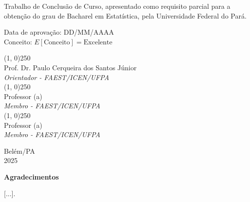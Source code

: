 \vspace{2.0 cm}

{\normalsize
\hfill \parbox{8.0 cm}{Trabalho de Conclusão de Curso, apresentado como
requisito parcial para a obtenção do grau de Bacharel em Estatística, pela Universidade Federal do Pará.}
}

\vspace{1.5 cm}

\noindent Data de aprovação: DD/MM/AAAA \\
Conceito: $E [\text{Conceito}] = \text{Excelente}$ \\

\vspace{2.25 cm}

\begin{center}
\line(1, 0){250} \\[0.4em]
Prof. Dr. Paulo Cerqueira dos Santos Júnior\\
\textit{Orientador - FAEST/ICEN/UFPA} \\[1.5em]

\line(1, 0){250} \\[0.4em]
Professor (a) \\
\textit{Membro - FAEST/ICEN/UFPA} \\[1.5em]

\line(1, 0){250} \\[0.4em]
Professor (a) \\
\textit{Membro - FAEST/ICEN/UFPA}
\end{center}

\vspace{2.25 cm}

\begin{center}
{\large
Belém/PA \\ 2025
}
\vfill
\end{center}

\newpage

\thispagestyle{empty}
\begin{center}
    {\LARGE \textbf{Agradecimentos}}
\end{center}

\vspace{1.0 cm}

[...].

\newpage